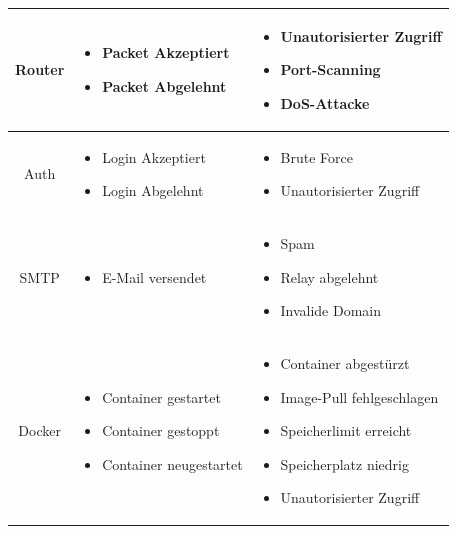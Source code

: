 \documentclass[a4paper,12pt]{report}
\begin{document}
\begin{table}[h!]
\begin{tabular}{|c|p{6cm}|p{6cm}|}
            \textnormal{Router} &
            \begin{itemize}
                \item Packet Akzeptiert
                \item Packet Abgelehnt
            \end{itemize} &
            \begin{itemize}
                \item Unautorisierter Zugriff
                \item Port-Scanning
                \item DoS-Attacke
            \end{itemize} \\ \hline

            \textnormal{Auth} &
            \begin{itemize}
                \item Login Akzeptiert
                \item Login Abgelehnt
            \end{itemize} &
            \begin{itemize}
                \item Brute Force
                \item Unautorisierter Zugriff
            \end{itemize} \\ \hline

            \textnormal{SMTP} &
            \begin{itemize}
                \item E-Mail versendet
            \end{itemize} &
            \begin{itemize}
                \item Spam
                \item Relay abgelehnt
                \item Invalide Domain
            \end{itemize} \\ \hline

            \textnormal{Docker} &
            \begin{itemize}
                \item Container gestartet
                \item Container gestoppt
                \item Container neugestartet
            \end{itemize} &
            \begin{itemize}
                \item Container abgestürzt
                \item Image-Pull fehlgeschlagen
                \item Speicherlimit erreicht
                \item Speicherplatz niedrig
                \item Unautorisierter Zugriff
            \end{itemize} \\ \hline


\end{tabular}
\end{table}
\end{document}
